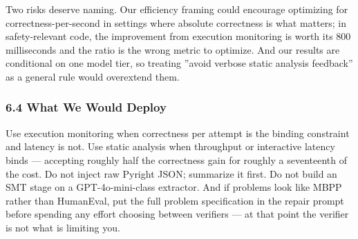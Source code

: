Two risks deserve naming. Our efficiency framing could encourage optimizing for correctness-per-second in settings where absolute correctness is what matters; in safety-relevant code, the improvement from execution monitoring is worth its 800 milliseconds and the ratio is the wrong metric to optimize. And our results are conditional on one model tier, so treating ''avoid verbose static analysis feedback'' as a general rule would overextend them.

\subsubsection{6.4 What We Would Deploy}

Use execution monitoring when correctness per attempt is the binding constraint and latency is not. Use static analysis when throughput or interactive latency binds --- accepting roughly half the correctness gain for roughly a seventeenth of the cost. Do not inject raw Pyright JSON; summarize it first. Do not build an SMT stage on a GPT-4o-mini-class extractor. And if problems look like MBPP rather than HumanEval, put the full problem specification in the repair prompt before spending any effort choosing between verifiers --- at that point the verifier is not what is limiting you.


